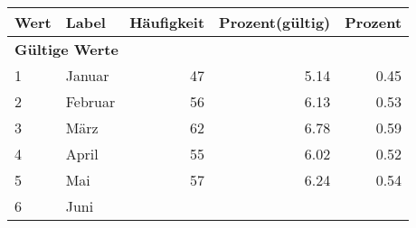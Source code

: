      \begin{longtable}{lXrrr}
     \toprule
     \textbf{Wert} & \textbf{Label} & \textbf{Häufigkeit} & \textbf{Prozent(gültig)} & \textbf{Prozent} \\
     \endhead
     \midrule
     \multicolumn{5}{l}{\textbf{Gültige Werte}}\\

     1 &
     \multicolumn{1}{X}{ Januar   } &


       \num{47} &
       \num[round-mode=places,round-precision=2]{5.14} &
         \num[round-mode=places,round-precision=2]{0.45} \\

     2 &
     \multicolumn{1}{X}{ Februar   } &


       \num{56} &
       \num[round-mode=places,round-precision=2]{6.13} &
         \num[round-mode=places,round-precision=2]{0.53} \\

     3 &
     \multicolumn{1}{X}{ März   } &


       \num{62} &
       \num[round-mode=places,round-precision=2]{6.78} &
         \num[round-mode=places,round-precision=2]{0.59} \\

     4 &
     \multicolumn{1}{X}{ April   } &


       \num{55} &
       \num[round-mode=places,round-precision=2]{6.02} &
         \num[round-mode=places,round-precision=2]{0.52} \\

     5 &
     \multicolumn{1}{X}{ Mai   } &


       \num{57} &
       \num[round-mode=places,round-precision=2]{6.24} &
         \num[round-mode=places,round-precision=2]{0.54} \\

     6 &
     \multicolumn{1}{X}{ Juni   } &



\end{longtable}
